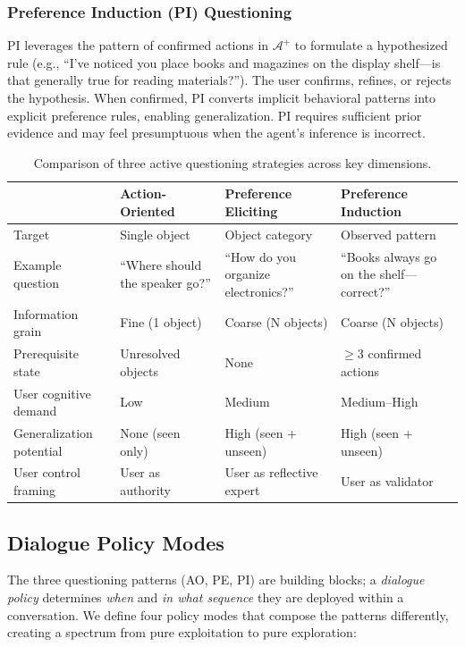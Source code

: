 \documentclass[a4paper,fleqn]{cas-sc}
\begin{document}
\subsubsection{Preference Induction (PI) Questioning}

PI leverages the pattern of confirmed actions in $\mathcal{A}^+$ to formulate a hypothesized rule (e.g., ``I've noticed you place books and magazines on the display shelf---is that generally true for reading materials?''). The user confirms, refines, or rejects the hypothesis. When confirmed, PI converts implicit behavioral patterns into explicit preference rules, enabling generalization. PI requires sufficient prior evidence and may feel presumptuous when the agent's inference is incorrect.

\begin{table}[t]
\caption{Comparison of three active questioning strategies across key dimensions.}\label{tbl:strategies}
\begin{tabular*}{\tblwidth}{@{}p{2.5cm}p{3cm}p{3cm}p{3cm}@{}}
\toprule
 & \textbf{Action-Oriented} & \textbf{Preference Eliciting} & \textbf{Preference Induction} \\
\midrule
Target & Single object & Object category & Observed pattern \\
Example question & ``Where should the speaker go?'' & ``How do you organize electronics?'' & ``Books always go on the shelf---correct?'' \\
Information grain & Fine (1 object) & Coarse (N objects) & Coarse (N objects) \\
Prerequisite state & Unresolved objects & None & $\geq$3 confirmed actions \\
User cognitive demand & Low & Medium & Medium--High \\
Generalization potential & None (seen only) & High (seen + unseen) & High (seen + unseen) \\
User control framing & User as authority & User as reflective expert & User as validator \\
\bottomrule
\end{tabular*}
\end{table}

\subsection{Dialogue Policy Modes}\label{sec:policies}

The three questioning patterns (AO, PE, PI) are building blocks; a \emph{dialogue policy} determines \emph{when} and \emph{in what sequence} they are deployed within a conversation. We define four policy modes that compose the patterns differently, creating a spectrum from pure exploitation to pure exploration:
\end{document}
